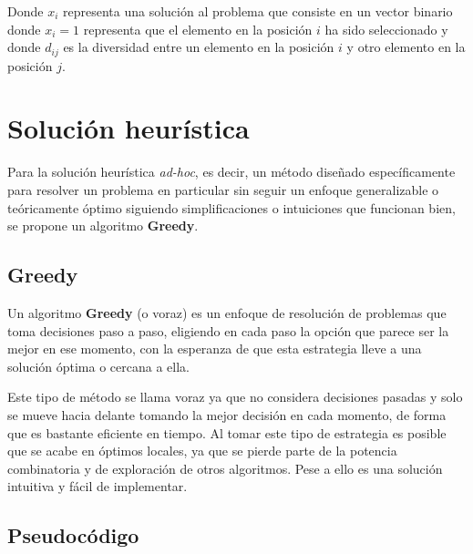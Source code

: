 \documentclass[12pt,letterpaper]{article}
\begin{document}
Donde $x_i$ representa una solución al problema que consiste en un vector binario donde $x_i=1$ representa que el elemento en la posición $i$ ha sido seleccionado y donde $d_{ij}$ es la diversidad entre un elemento en la posición $i$ y otro elemento en la posición $j$.

\section{Solución heurística}
Para la solución heurística \textit{ad-hoc}, es decir, un método diseñado específicamente para resolver un problema en particular sin seguir un enfoque generalizable o teóricamente óptimo siguiendo simplificaciones o intuiciones que funcionan bien, se propone un algoritmo \textbf{Greedy}.

\subsection{Greedy}
Un algoritmo \textbf{Greedy} (o voraz) es un enfoque de resolución de problemas que toma decisiones paso a paso, eligiendo en cada paso la opción que parece ser la mejor en ese momento, con la esperanza de que esta estrategia lleve a una solución óptima o cercana a ella.

Este tipo de método se llama voraz ya que no considera decisiones pasadas y solo se mueve hacia delante tomando la mejor decisión en cada momento, de forma que es bastante eficiente en tiempo. Al tomar este tipo de estrategia es posible que se acabe en óptimos locales, ya que se pierde parte de la potencia combinatoria y de exploración de otros algoritmos. Pese a ello es una solución intuitiva y fácil de implementar.

\subsection{Pseudocódigo}
\end{document}
